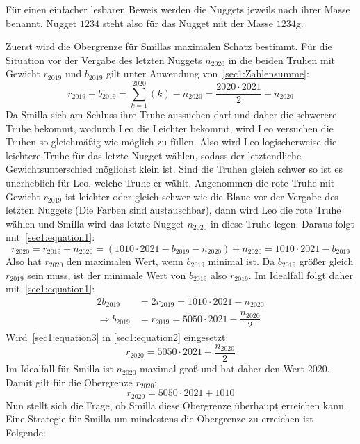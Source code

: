 \documentclass[10pt, a4paper]{amsart}
\makeatletter
\renewenvironment{proof}[1][\proofname]{\par
\pushQED{\qed}%
\normalfont \topsep6\p@\@plus6\p@\relax
\trivlist
\item\relax
{\bfseries#1}\hspace\labelsep\ignorespaces
}{%
\popQED\endtrivlist\@endpefalse
}
\newenvironment{proof thm}[1]{
\begin{proof}[\proofname~(#1)]}{\end{proof}}
\makeatother
\begin{document}
\begin{proof}
  Für einen einfacher lesbaren Beweis werden die Nuggets jeweils nach ihrer
  Masse benannt. Nugget $1234$ steht also für das Nugget mit der Masse $1234$g.
  
  Zuerst wird die Obergrenze für Smillas maximalen Schatz bestimmt. Für die
  Situation vor der Vergabe des letzten Nuggets $n_{2020}$ in die beiden Truhen
  mit Gewicht $r_{2019}$ und $b_{2019}$ gilt unter Anwendung
  von~\autoref{sec1:Zahlensumme}:
  \begin{equation}\label{sec1:equation1}
    r_{2019}+b_{2019}=\sum_{k=1}^{2020}\left(k\right)-n_{2020}=\dfrac{2020\cdot2021}{2}-n_{2020}
  \end{equation}
  Da Smilla sich am Schluss ihre Truhe aussuchen darf und daher die schwerere
  Truhe bekommt, wodurch Leo die Leichter bekommt, wird Leo versuchen die Truhen
  so gleichmäßig wie möglich zu füllen. Also wird Leo logischerweise die
  leichtere Truhe für das letzte Nugget wählen, sodass der letztendliche
  Gewichtsunterschied möglichst klein ist. Sind die Truhen gleich schwer so ist
  es unerheblich für Leo, welche Truhe er wählt. Angenommen die rote Truhe mit
  Gewicht $r_{2019}$ ist leichter oder gleich schwer wie die Blaue vor der
  Vergabe des letzten Nuggets (Die Farben sind austauschbar), dann wird Leo die
  rote Truhe wählen und Smilla wird das letzte Nugget $n_{2020}$ in diese Truhe
  legen. Daraus folgt mit~\eqref{sec1:equation1}:
  \begin{equation}\label{sec1:equation2}
    r_{2020}=r_{2019}+n_{2020}=(1010\cdot2021-b_{2019}-n_{2020})+n_{2020}=1010\cdot2021-b_{2019}
  \end{equation}
  Also hat $r_{2020}$ den maximalen Wert, wenn $b_{2019}$ minimal ist. Da
  $b_{2019}$ größer gleich $r_{2019}$ sein muss, ist der minimale Wert von
  $b_{2019}$ also $r_{2019}$. Im Idealfall folgt daher
  mit~\eqref{sec1:equation1}:
  \begin{equation}\label{sec1:equation3}
    \begin{split}
      2b_{2019} &= 2r_{2019} =1010\cdot2021-n_{2020}\\
      \Rightarrow b_{2019} &= r_{2019}=5050\cdot2021-\dfrac{n_{2020}}{2}
    \end{split}
  \end{equation}
  Wird~\eqref{sec1:equation3} in \eqref{sec1:equation2} eingesetzt:
  \begin{equation*}
    r_{2020}=5050\cdot2021+\dfrac{n_{2020}}{2}
  \end{equation*}
  Im Idealfall für Smilla ist $n_{2020}$ maximal groß und hat daher den Wert
  2020. Damit gilt für die Obergrenze $r_{2020}$:
  \begin{equation*}
    r_{2020}=5050\cdot2021+1010
  \end{equation*}
  Nun stellt sich die Frage, ob Smilla diese Obergrenze überhaupt erreichen
  kann. Eine Strategie für Smilla um mindestens die Obergrenze zu erreichen ist Folgende:\\


\end{proof}
\end{document}
